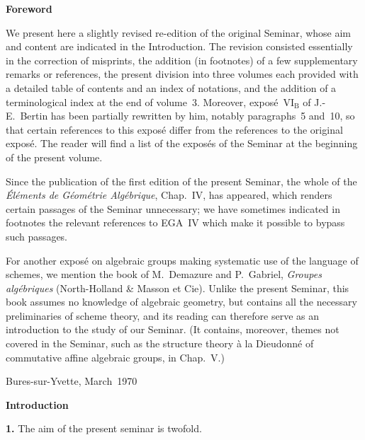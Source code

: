 \label{Intro}

\begin{center}
{\large\bfseries Foreword}
\end{center}

We present here a slightly revised re-edition of the original Seminar, whose
aim and content are indicated in the Introduction. The revision consisted
essentially in the correction of misprints, the addition (in footnotes) of a
few supplementary remarks or references, the present division into three
volumes each provided with a detailed table of contents and an index of
notations, and the addition of a terminological index at the end of
volume~3. Moreover, expos\'e~$\mathrm{VI}_{\mathrm{B}}$ of J.-E.~Bertin has
been partially rewritten by him, notably paragraphs~5 and~10, so that certain
references to this expos\'e differ from the references to the original
expos\'e. The reader will find a list of the expos\'es of the Seminar at the
beginning of the present volume.

Since the publication of the first edition of the present Seminar, the whole
of the \emph{\'El\'ements de G\'eom\'etrie Alg\'ebrique}, Chap.~IV, has
appeared, which renders certain passages of the Seminar unnecessary; we have
sometimes indicated in footnotes the relevant references to EGA~IV which make
it possible to bypass such passages.

For another expos\'e on algebraic groups making systematic use of the
language of schemes, we mention the book of M.~Demazure and P.~Gabriel,
\emph{Groupes alg\'ebriques} (North-Holland \& Masson et Cie). Unlike the
present Seminar, this book assumes no knowledge of algebraic geometry, but
contains all the necessary preliminaries of scheme theory, and its reading
can therefore serve as an introduction to the study of our Seminar. (It
contains, moreover, themes not covered in the Seminar, such as the structure
theory \`a la Dieudonn\'e of commutative affine algebraic groups, in
\loccit Chap.~V.)

\medskip
\begin{flushright}
Bures-sur-Yvette, March~1970
\end{flushright}

\begin{center}
{\large\bfseries Introduction}
\end{center}

\par{}
\noindent\textbf{1.}\label{Intro.sec.1}
The aim of the present seminar is twofold.

